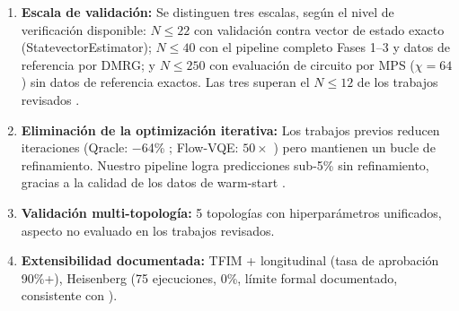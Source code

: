 \documentclass[11pt,a4paper,spanish]{book}
\begin{document}
\begin{enumerate}
    \item \textbf{Escala de validación:} Se distinguen tres escalas, según el nivel de verificación disponible: $N \leq 22$ con validación contra vector de estado exacto (StatevectorEstimator); $N \leq 40$ con el pipeline completo Fases 1--3 y datos de referencia por DMRG; y $N \leq 250$ con evaluación de circuito por MPS ($\chi = 64$) sin datos de referencia exactos. Las tres superan el $N \leq 12$ de los trabajos revisados \citep{miao2024, zhang2025, zou2026}.

    \item \textbf{Eliminación de la optimización iterativa:} Los trabajos previos reducen iteraciones (Qracle: $-$64\% \citep{zhang2025}; Flow-VQE: $50\times$ \citep{zou2026}) pero mantienen un bucle de refinamiento. Nuestro pipeline logra predicciones sub-5\% sin refinamiento, gracias a la calidad de los datos de warm-start \citep{puig2025, schiffer2026}.

    \item \textbf{Validación multi-topología:} 5 topologías con hiperparámetros unificados, aspecto no evaluado en los trabajos revisados.

    \item \textbf{Extensibilidad documentada:} TFIM + longitudinal (tasa de aprobación 90\%+), Heisenberg (75 ejecuciones, 0\%, límite formal documentado, consistente con \citet{wiersema2020, huang2026frustration}).
\end{enumerate}
\end{document}
